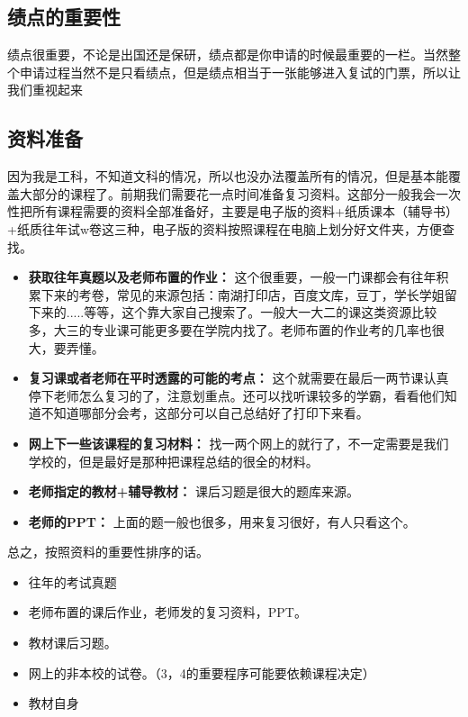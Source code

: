\documentclass[a4paper]{article}
\begin{document}
\subsection{绩点的重要性} \label{sub:importance}
绩点很重要，不论是出国还是保研，绩点都是你申请的时候最重要的一栏。当然整个申请过程当然不是只看绩点，但是绩点相当于一张能够进入复试的门票，所以让我们重视起来~

\subsection{资料准备} \label{sub:prepare}
因为我是工科，不知道文科的情况，所以也没办法覆盖所有的情况，但是基本能覆盖大部分的课程了。前期我们需要花一点时间准备复习资料。这部分一般我会一次性把所有课程需要的资料全部准备好，主要是电子版的资料+纸质课本（辅导书）+纸质往年试w卷这三种，电子版的资料按照课程在电脑上划分好文件夹，方便查找。

\begin{itemize}
	\item{\textbf{获取往年真题以及老师布置的作业：} 这个很重要，一般一门课都会有往年积累下来的考卷，常见的来源包括：南湖打印店，百度文库，豆丁，学长学姐留下来的.....等等，这个靠大家自己搜索了。一般大一大二的课这类资源比较多，大三的专业课可能更多要在学院内找了。老师布置的作业考的几率也很大，要弄懂。}
    \item{\textbf{复习课或者老师在平时透露的可能的考点：} 这个就需要在最后一两节课认真停下老师怎么复习的了，注意划重点。还可以找听课较多的学霸，看看他们知道不知道哪部分会考，这部分可以自己总结好了打印下来看。}
    \item{\textbf{网上下一些该课程的复习材料：} 找一两个网上的就行了，不一定需要是我们学校的，但是最好是那种把课程总结的很全的材料。}
    \item{\textbf{老师指定的教材+辅导教材：} 课后习题是很大的题库来源。}
    \item{\textbf{老师的PPT：} 上面的题一般也很多，用来复习很好，有人只看这个。}
\end{itemize}

总之，按照资料的重要性排序的话。

\begin{itemize}
	\item{往年的考试真题}
    \item{老师布置的课后作业，老师发的复习资料，PPT。}
    \item{教材课后习题。}
    \item{网上的非本校的试卷。（3，4的重要程序可能要依赖课程决定）}
    \item{教材自身}
\end{itemize}
\end{document}
